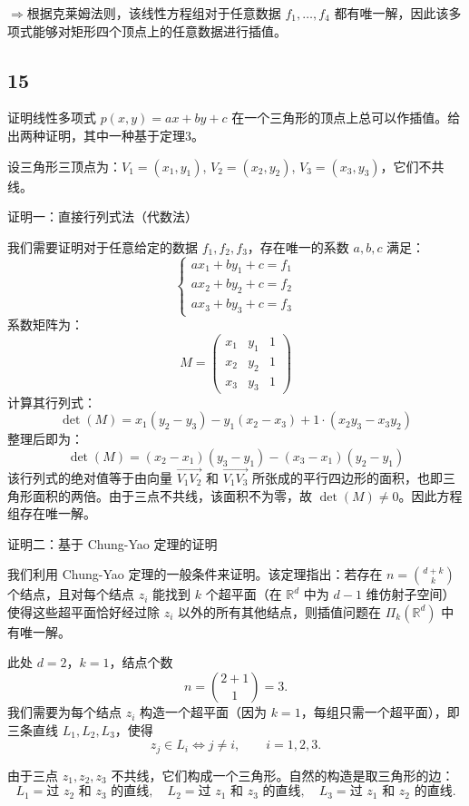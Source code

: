 \documentclass{article}
\begin{document}
$\Rightarrow$根据克莱姆法则，该线性方程组对于任意数据 \( f_1, \dots, f_4 \) 都有唯一解，因此该多项式能够对矩形四个顶点上的任意数据进行插值。

\subsection*{15}

证明线性多项式 \( p(x,y)=ax+by+c \) 在一个三角形的顶点上总可以作插值。给出两种证明，其中一种基于定理3。

设三角形三顶点为：\( V_1=(x_1,y_1) \), \( V_2=(x_2,y_2) \), \( V_3=(x_3,y_3) \)，它们不共线。

证明一：直接行列式法（代数法）

我们需要证明对于任意给定的数据 \( f_1, f_2, f_3 \)，存在唯一的系数 \( a, b, c \) 满足：
\[
\begin{cases}
a x_1 + b y_1 + c = f_1 \\
a x_2 + b y_2 + c = f_2 \\
a x_3 + b y_3 + c = f_3
\end{cases}
\]
系数矩阵为：
\[
M = \begin{pmatrix}
x_1 & y_1 & 1 \\
x_2 & y_2 & 1 \\
x_3 & y_3 & 1
\end{pmatrix}
\]
计算其行列式：
\[
\det(M) = x_1(y_2 - y_3) - y_1(x_2 - x_3) + 1 \cdot (x_2 y_3 - x_3 y_2)
\]
整理后即为：
\[
\det(M) = (x_2 - x_1)(y_3 - y_1) - (x_3 - x_1)(y_2 - y_1)
\]
该行列式的绝对值等于由向量 \( \vec{V_1 V_2} \) 和 \( \vec{V_1 V_3} \) 所张成的平行四边形的面积，也即三角形面积的两倍。由于三点不共线，该面积不为零，故 \( \det(M) \neq 0 \)。因此方程组存在唯一解。

证明二：基于 Chung-Yao 定理的证明 

  我们利用 Chung-Yao 定理的一般条件来证明。该定理指出：若存在 \( n = \binom{d+k}{k} \) 个结点，且对每个结点 \( z_i \) 能找到 \( k \) 个超平面（在 \( \mathbb{R}^d \) 中为 \( d-1 \) 维仿射子空间）使得这些超平面恰好经过除 \( z_i \) 以外的所有其他结点，则插值问题在 \( \Pi_k(\mathbb{R}^d) \) 中有唯一解。

  此处 \( d = 2 \)，\( k = 1 \)，结点个数
  \[
  n = \binom{2+1}{1} = 3.
  \]
  我们需要为每个结点 \( z_i \) 构造一个超平面（因为 \( k=1 \)，每组只需一个超平面），即三条直线 \( L_1, L_2, L_3 \)，使得
  \[
  z_j \in L_i \iff j \neq i, \qquad i = 1,2,3.
  \]

  由于三点 \( z_1, z_2, z_3 \) 不共线，它们构成一个三角形。自然的构造是取三角形的边：
  \[
  L_1 = \text{过 } z_2 \text{ 和 } z_3 \text{ 的直线},\quad
  L_2 = \text{过 } z_1 \text{ 和 } z_3 \text{ 的直线},\quad
  L_3 = \text{过 } z_1 \text{ 和 } z_2 \text{ 的直线}.
  \]
\end{document}
